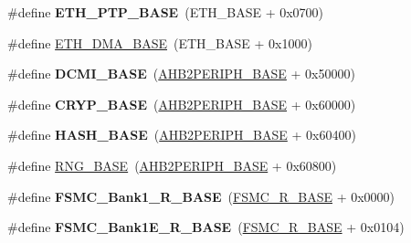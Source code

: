 \begin{DoxyCompactItemize}
\item 
\hypertarget{group___peripheral__memory__map_gaa0f60b922aeb7275c785cbaa8f94ecf0}{\#define {\bfseries E\-T\-H\-\_\-\-P\-T\-P\-\_\-\-B\-A\-S\-E}~(E\-T\-H\-\_\-\-B\-A\-S\-E + 0x0700)}\label{group___peripheral__memory__map_gaa0f60b922aeb7275c785cbaa8f94ecf0}

\item 
\#define \hyperlink{group___peripheral__memory__map_gace2114e1b37c1ba88d60f3e831b67e93}{E\-T\-H\-\_\-\-D\-M\-A\-\_\-\-B\-A\-S\-E}~(E\-T\-H\-\_\-\-B\-A\-S\-E + 0x1000)
\item 
\hypertarget{group___peripheral__memory__map_ga55b794507e021135486de57129a2505c}{\#define {\bfseries D\-C\-M\-I\-\_\-\-B\-A\-S\-E}~(\hyperlink{group___peripheral__memory__map_gaeedaa71d22a1948492365e2cd26cfd46}{A\-H\-B2\-P\-E\-R\-I\-P\-H\-\_\-\-B\-A\-S\-E} + 0x50000)}\label{group___peripheral__memory__map_ga55b794507e021135486de57129a2505c}

\item 
\hypertarget{group___peripheral__memory__map_ga019f3ad3b3212e56b45984efd8b8efef}{\#define {\bfseries C\-R\-Y\-P\-\_\-\-B\-A\-S\-E}~(\hyperlink{group___peripheral__memory__map_gaeedaa71d22a1948492365e2cd26cfd46}{A\-H\-B2\-P\-E\-R\-I\-P\-H\-\_\-\-B\-A\-S\-E} + 0x60000)}\label{group___peripheral__memory__map_ga019f3ad3b3212e56b45984efd8b8efef}

\item 
\hypertarget{group___peripheral__memory__map_ga398d121ca28c3f0f90a140b62184e242}{\#define {\bfseries H\-A\-S\-H\-\_\-\-B\-A\-S\-E}~(\hyperlink{group___peripheral__memory__map_gaeedaa71d22a1948492365e2cd26cfd46}{A\-H\-B2\-P\-E\-R\-I\-P\-H\-\_\-\-B\-A\-S\-E} + 0x60400)}\label{group___peripheral__memory__map_ga398d121ca28c3f0f90a140b62184e242}

\item 
\#define \hyperlink{group___peripheral__memory__map_gab92662976cfe62457141e5b4f83d541c}{R\-N\-G\-\_\-\-B\-A\-S\-E}~(\hyperlink{group___peripheral__memory__map_gaeedaa71d22a1948492365e2cd26cfd46}{A\-H\-B2\-P\-E\-R\-I\-P\-H\-\_\-\-B\-A\-S\-E} + 0x60800)
\item 
\hypertarget{group___peripheral__memory__map_gad196fe6f5e4041b201d14f43508c06d2}{\#define {\bfseries F\-S\-M\-C\-\_\-\-Bank1\-\_\-\-R\-\_\-\-B\-A\-S\-E}~(\hyperlink{group___peripheral__memory__map_gaddf0e199dccba83272b20c9fb4d3aaed}{F\-S\-M\-C\-\_\-\-R\-\_\-\-B\-A\-S\-E} + 0x0000)}\label{group___peripheral__memory__map_gad196fe6f5e4041b201d14f43508c06d2}

\item 
\hypertarget{group___peripheral__memory__map_gaea182589c84aee30b7f735474d8774e2}{\#define {\bfseries F\-S\-M\-C\-\_\-\-Bank1\-E\-\_\-\-R\-\_\-\-B\-A\-S\-E}~(\hyperlink{group___peripheral__memory__map_gaddf0e199dccba83272b20c9fb4d3aaed}{F\-S\-M\-C\-\_\-\-R\-\_\-\-B\-A\-S\-E} + 0x0104)}\label{group___peripheral__memory__map_gaea182589c84aee30b7f735474d8774e2}


\end{DoxyCompactItemize}
